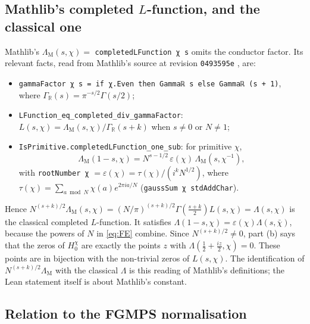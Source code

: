\documentclass[11pt]{article}
\theoremstyle{definition}
\newcommand{\lean}[1]{\texttt{#1}}
\newcommand{\GR}{\Gamma_{\mathbb{R}}}
\newcommand{\Lc}{\Lambda}
\begin{document}
\subsection{Mathlib's completed $L$-function, and the classical one}\label{sec:mathlibLambda}

Mathlib's $\Lc_{\mathrm{M}}(s,\chi) = $ \lstinline[basicstyle=\ttfamily,backgroundcolor={}]|completedLFunction χ s| omits the conductor factor. Its relevant facts, read from Mathlib's source at revision \lean{0493595e} \cite[ADD1 \S5]{bbrecords}, are:
\begin{itemize}
\item \lstinline[basicstyle=\ttfamily,backgroundcolor={}]|gammaFactor χ s = if χ.Even then Gammaℝ s else Gammaℝ (s + 1)|, where $\GR(s) = \pi^{-s/2}\Gamma(s/2)$;
\item \lean{LFunction\_\allowbreak{}eq\_\allowbreak{}completed\_\allowbreak{}div\_\allowbreak{}gammaFactor}: $L(s,\chi) = \Lc_{\mathrm{M}}(s,\chi)/\GR(s+k)$ when $s \ne 0$ or $N \ne 1$;
\item \lean{IsPrimitive.completedLFunction\_\allowbreak{}one\_\allowbreak{}sub}: for primitive $\chi$,
\begin{equation}\label{eq:FE}
\Lc_{\mathrm{M}}(1-s,\chi) = N^{s-1/2}\,\varepsilon(\chi)\,\Lc_{\mathrm{M}}(s,\chi^{-1}),
\end{equation}
with \lstinline[basicstyle=\ttfamily,backgroundcolor={}]|rootNumber χ| $= \varepsilon(\chi) = \tau(\chi)/(i^k N^{1/2})$, where $\tau(\chi) = \sum_{a \bmod N}\chi(a)e^{2\pi i a/N}$ (\lstinline[basicstyle=\ttfamily,backgroundcolor={}]|gaussSum χ stdAddChar|).
\end{itemize}
Hence $N^{(s+k)/2}\Lc_{\mathrm{M}}(s,\chi) = (N/\pi)^{(s+k)/2}\Gamma(\tfrac{s+k}2)L(s,\chi) = \Lc(s,\chi)$ is the classical completed $L$-function. It satisfies $\Lc(1-s,\chi) = \varepsilon(\chi)\Lc(s,\bar\chi)$, because the powers of $N$ in \eqref{eq:FE} combine. Since $N^{(s+k)/2} \ne 0$, part (b) says that the zeros of $H^\chi_0$ are exactly the points $z$ with $\Lc(\tfrac12 + \tfrac{iz}2,\chi) = 0$. These points are in bijection with the non-trivial zeros of $L(s,\chi)$. The identification of $N^{(s+k)/2}\Lc_{\mathrm{M}}$ with the classical $\Lc$ is this reading of Mathlib's definitions; the Lean statement itself is about Mathlib's constant.

\subsection{Relation to the FGMPS normalisation}\label{sec:normalisation}
\end{document}
